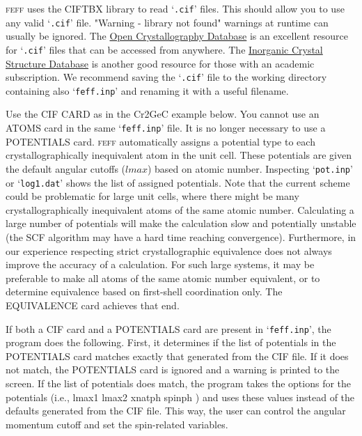 \documentclass[11pt,oneside]{report} %
\renewcommand{\htmladdnormallink}[2]{\href{#2}{#1}}
\renewcommand{\htmlref}[2]{\hyperlink{#2}{#1}}
\newcommand{\program}[1]{\textsc{#1}}
\newcommand{\feff}{\program{feff}}
\newcommand{\file}[1]{`\texttt{#1}'}
\renewcommand{\htmlref}[2]{{#1}} %
\begin{document}
{\feff} uses the CIFTBX library to read \file{.cif} files.  This should allow you to use any valid \file{.cif} file.  "Warning - library not found" warnings at runtime can usually be ignored.  The \htmladdnormallink{Open Crystallography Database}{http://www.crystallography.net/search.html} is an excellent resource for \file{.cif} files that can be accessed from anywhere.  The \htmladdnormallink{Inorganic Crystal Structure Database}{http://icsd.fiz-karlsruhe.de/} is another good resource for those with an academic subscription.  We recommend saving the \file{.cif} file to the working directory containing also \file{feff.inp} and renaming it with a useful filename.

Use the CIF CARD as in the \htmlref{Cr2GeC example}{K-space-example-Cr2GeC} below.  You cannot use an ATOMS card in the same \file{feff.inp} file.  It is no longer necessary to use a POTENTIALS card.  {\feff} automatically assigns a potential type to each crystallographically inequivalent atom in the unit cell.  These potentials are given the default angular cutoffs ($lmax$) based on atomic number.  Inspecting \file{pot.inp} or \file{log1.dat} shows the list of assigned potentials.  Note that the current scheme could be problematic for large unit cells, where there might be many crystallographically inequivalent atoms of the same atomic number.  Calculating a large number of potentials will make the calculation slow and potentially unstable (the SCF algorithm may have a hard time reaching convergence).  Furthermore, in our experience respecting strict crystallographic equivalence does not always improve the accuracy of a calculation.  For such large systems, it may be preferable to make all atoms of the same atomic number equivalent, or to determine equivalence based on first-shell coordination only.  The EQUIVALENCE card achieves that end.

If both a CIF card and a POTENTIALS card are present in \file{feff.inp}, the program does the following.  First, it determines if the list of potentials in the POTENTIALS card matches exactly that generated from the CIF file.  If it does not match, the POTENTIALS card is ignored and a warning is printed to the screen.  If the list of potentials does match, the program takes the options for the potentials (i.e.,  lmax1  lmax2  xnatph  spinph ) and uses these values instead of the defaults generated from the CIF file.  This way, the user can control the angular momentum cutoff and set the spin-related variables.
\end{document}
